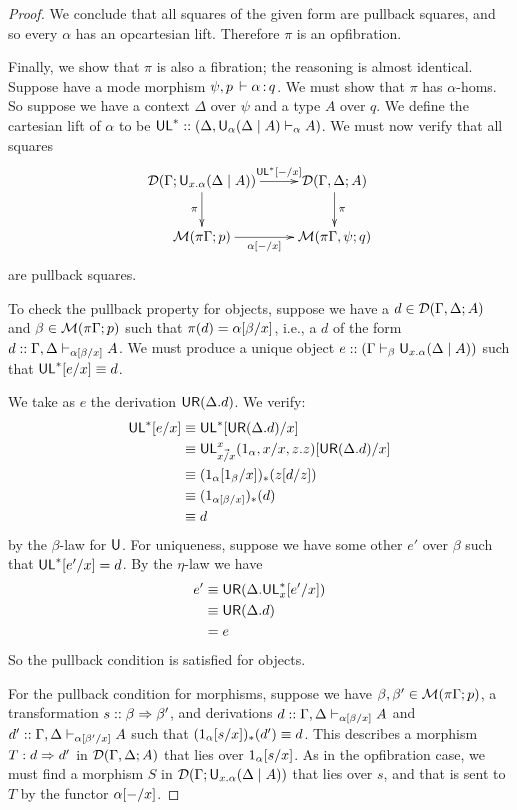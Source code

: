 \begin{proof}
We conclude that all squares of the given form are pullback squares, and so every $\alpha$ has an opcartesian lift. Therefore $\pi$ is an opfibration.

Finally, we show that $\pi$ is also a fibration; the reasoning is almost identical. Suppose have a mode morphism $\psi, p \, \vdash \alpha \, \mathit{:} \, q$. We must show that $\pi$ has $\alpha$-homs. So suppose we have a context $\Delta$ over $\psi$ and a type $A$ over $q$. We define the cartesian lift of $\alpha$ to be $\mathsf{UL}^* :: (\Delta, \mathsf{U}_{\alpha}(\Delta \mid A) \vdash_{\alpha} A)$. We must now verify that all squares
\[ \xymatrix{
    \cD(\Gamma;\U{x.\alpha}{\Delta}{A}) \ar[r]^-{\Cut{\UL^*}{-}{x}} \ar[d]_\pi &
    \cD(\Gamma,\Delta;A) \ar[d]^\pi \\
    \M(\pi\Gamma;p) \ar[r]_-{\Cut{\alpha}{-}{x}} &
    \M(\pi\Gamma, \psi; q)
  }\]
are pullback squares.

To check the pullback property for objects, suppose we have a $d \in \mathcal{D}(\Gamma,\Delta;A)$ and $\beta \in \mathcal{M}(\pi\Gamma;p)$ such that $\pi(d) = \alpha[\beta/x]$, i.e., a $d$ of the form $d :: \Gamma, \Delta \vdash_{\alpha[\beta/x]} A$. We must produce a unique object $e :: (\Gamma \vdash_{\beta} \mathsf{U}_{x.\alpha}(\Delta \mid A))$ such that $\mathsf{UL}^*[e/x] \equiv d$.

We take as $e$ the derivation $\mathsf{UR}(\Delta.d)$. We verify:
\begin{align*}
\mathsf{UL}^*[e/x] 
&\equiv \mathsf{UL}^*[\mathsf{UR}(\Delta.d)/x] \\
&\equiv \mathsf{UL}^{x}_{\vec{x/x}}(1_\alpha,{x}/x,z.z)
[\mathsf{UR}(\Delta.d)/x] \\
&\equiv (1_\alpha[1_\beta/x])_*(z[d/z]) \\
&\equiv (1_{\alpha[\beta/x]})_*(d) \\
&\equiv d
\end{align*}
by the $\beta$-law for $\mathsf{U}$. For uniqueness, suppose we have some other $e'$ over $\beta$ such that $\mathsf{UL}^*[e'/x] = d$. By the $\eta$-law we have
\begin{align*}
e' 
&\equiv \mathsf{UR}(\Delta.\mathsf{UL}^*_{x}[e'/x])\\
&\equiv \mathsf{UR}(\Delta.d) \\
&= e
\end{align*}
So the pullback condition is satisfied for objects.

For the pullback condition for morphisms, suppose we have $\beta, \beta' \in \mathcal{M}(\pi\Gamma;p)$, a transformation $s :: \beta \Rightarrow \beta'$, and derivations $d :: \Gamma, \Delta \vdash_{\alpha[\beta/x]} A$ and $d' :: \Gamma, \Delta \vdash_{\alpha[\beta'/x]} A$ such that $(1_\alpha[s/x])_*(d') \equiv d$. This describes a morphism $T : d \Rightarrow d'$ in $\mathcal{D}(\Gamma,\Delta;A)$ that lies over $1_\alpha[s/x]$. As in the opfibration case, we must find a morphism $S$ in $\mathcal{D}(\Gamma;\mathsf{U}_{x.\alpha}(\Delta \mid A))$ that lies over $s$, and that is sent to $T$ by the functor $\alpha[-/x]$.


\end{proof}
